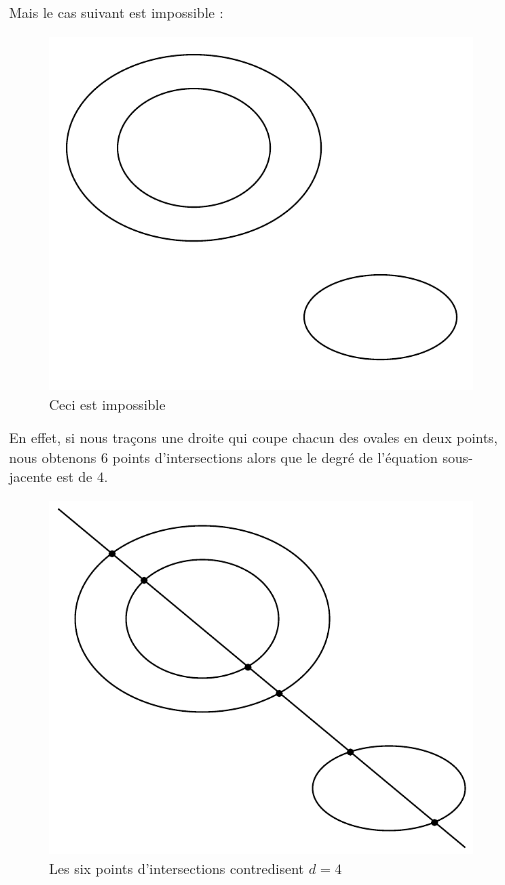 \documentclass{livre}
\begin{document}
Mais le cas suivant est impossible :
\begin{figure}[H]
\begin{center}
\includegraphics[scale=0.6]{Figures/fig2}
\end{center}
\caption{Ceci est impossible}
\end{figure}
En effet, si nous traçons une droite qui coupe chacun des ovales en deux points, nous obtenons $6$ points d'intersections alors que le degré de l'équation sous-jacente est de $4$.
\begin{figure}[H]
\begin{center}
\includegraphics[scale=0.55]{Figures/fig3}
\end{center}
\caption{Les six points d'intersections contredisent $d=4$}
\end{figure}
\end{document}
